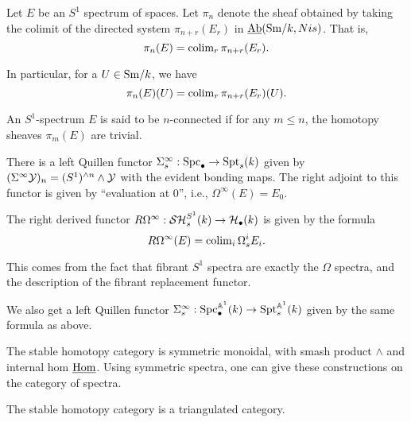 \documentclass{amsart}%
\begin{document}
\begin{definition}
  Let $E$ be an $S^1$ spectrum of spaces. Let $\pi_n$ denote the sheaf
  obtained by taking the colimit of the directed system
  $\pi_{n+r}(E_r)$ in $\operatorname{\underline{Ab}}(\mathrm{Sm}/k,Nis)$. That is,
  \begin{equation*}
    \pi_n(E) = \operatorname{colim}_{r} \pi_{n+r}(E_r). 
  \end{equation*}

  In particular, for a $U \in \mathrm{Sm}/k$, we have 
  \begin{equation*}
    \pi_n(E)(U) = \operatorname{colim}_{r} \pi_{n+r}(E_r)(U).
  \end{equation*}
\end{definition}

\begin{definition}
  An $S^1$-spectrum $E$ is said to be $n$-connected if for any
  $m\leq n$, the homotopy sheaves $\pi_m(E)$ are trivial.
\end{definition}

\begin{definition}
  There is a left Quillen functor
  $\Sigma^{\infty}_s : \mathrm{Spc}_{\bullet} \to \mathrm{Spt}_s(k)$ given by
  $(\Sigma^{\infty}\mathcal{Y})_n =(S^1)^{\wedge n} \wedge \mathcal{Y}$ with the
  evident bonding maps. The right adjoint to this functor is given by
  ``evaluation at $0$'', i.e., $\Omega^{\infty}(E) = E_0$.
\end{definition}

\begin{remark}
  The right derived functor
  $R\Omega^{\infty} : \mathcal{SH}^{S^1}_s(k) \to \mathcal{H}_{\bullet}(k)$ is given by
  the formula
  \begin{equation*}
    R\Omega^{\infty}(E) = \operatorname{colim}_i \Omega_s^{i}E_i.
  \end{equation*}

  This comes from the fact that fibrant $S^1$ spectra are exactly the
  $\Omega$ spectra, and the description of the fibrant replacement
  functor. 
\end{remark}

\begin{remark}
  We also get a left Quillen functor
  $ \Sigma^{\infty}_s : \mathrm{Spc}_{\bullet}^{\mathbb{A}^1}(k) \to
  \mathrm{Spt}_s^{\mathbb{A}^1}(k)$ given by the same formula as above.

\end{remark}

\begin{remark}
  The stable homotopy category is symmetric monoidal, with smash
  product $\wedge$ and internal hom $\underline{\operatorname{Hom}}$. Using
  symmetric spectra, one can give these constructions on the category
  of spectra.

  The stable homotopy category is a triangulated category.  
\end{remark}
\end{document}
